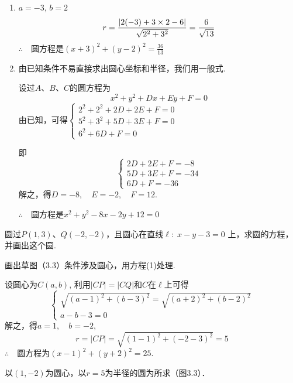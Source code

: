 \begin{solution}
\begin{enumerate}[(1)]
    \item $a=-3$, $b=2$
\[r=\dfrac{|2(-3)+3\times 2-6|}{\sqrt{2^2+3^2}}=\dfrac{6}{\sqrt{13}}\]
$\therefore\quad $圆方程是$(x+3)^2+(y-2)^2=\frac{36}{13}$
\item \begin{analyze}
由已知条件不易直接求出圆心坐标和半径，我们用一般式.
\end{analyze}

设过$A$、$B$、$C$的圆方程为
\[x^2+y^2+Dx+Ey+F=0\]
由已知，可得$\begin{cases}
    2^2+2^2+2D+2E+F=0\\
    5^2+3^2+5D+3E+F=0\\
    6^2+6D+F=0
\end{cases}$

即
\[\begin{cases}
    2D+2E+F=-8\\ 5D+3E+F=-34\\ 6D+F=-36
\end{cases}\]
解之，得$D=-8,\quad E=-2,\quad F=12$.

$\therefore\quad $圆方程是$x^2+y^2-8x-2y+12=0$
\end{enumerate}
\end{solution}

\begin{example}
    圆过$P(1,3)$、$Q(-2,-2)$，且圆心在直线$\ell:\; x-y-3=0$
上，求圆的方程，并画出这个圆.
\end{example}

\begin{analyze}
 画出草图（3.3）条件涉及圆心，用方程(1)处理.
\end{analyze}

\noindent
\begin{minipage}{.55\textwidth}\CTEXindent
\begin{solution}
设圆心为$C(a,b)$, 利用$|CP|=|CQ|$和$C$在$\ell$上可得
\[\begin{cases}
    \sqrt{(a-1)^2+(b-3)^2}=\sqrt{(a+2)^2+(b-2)^2}\\
    a-b-3=0
\end{cases}\]
解之，得$a=1,\quad b=-2$,
\[r=|CP|=\sqrt{(1-1)^2+(-2-3)^2}=5\]
$\therefore \quad $圆方程为$(x-1)^2+(y+2)^2=25$.

以$(1,-2)$为圆心，以$r=5$为半径的圆为所求（图3.3）．
\end{solution}
\end{minipage}
\hfill
\begin{minipage}{.4\textwidth}
\centering
{}
\end{minipage}

